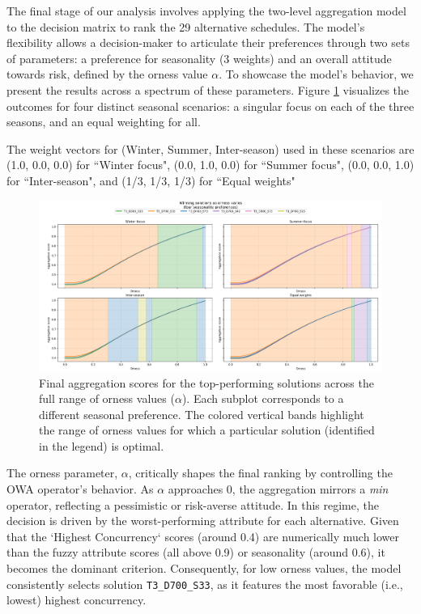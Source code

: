 \label{sec:results}

The final stage of our analysis involves applying the two-level aggregation model to the decision matrix to rank the 29 alternative schedules. The model's flexibility allows a decision-maker to articulate their preferences through two sets of parameters: a preference for seasonality (3 weights) and an overall attitude towards risk, defined by the orness value $\alpha$. To showcase the model's behavior, we present the results across a spectrum of these parameters. Figure \ref{fig:results_plot} visualizes the outcomes for four distinct seasonal scenarios: a singular focus on each of the three seasons, and an equal weighting for all. 

The weight vectors for (Winter, Summer, Inter-season) used in these scenarios are (1.0, 0.0, 0.0) for ``Winter focus", (0.0, 1.0, 0.0) for ``Summer focus", (0.0, 0.0, 1.0) for ``Inter-season", and (1/3, 1/3, 1/3) for ``Equal weights"

\begin{figure}[h!]
    \centering
    \begin{adjustwidth}{-1.2cm}{-1.8cm}
    \includegraphics[width=1.08\textwidth]{ch3/figures/ResultsOrness.png}
    \end{adjustwidth}
    \caption{Final aggregation scores for the top-performing solutions across the full range of orness values ($\alpha$). Each subplot corresponds to a different seasonal preference. The colored vertical bands highlight the range of orness values for which a particular solution (identified in the legend) is optimal.}
    \label{fig:results_plot}
\end{figure}

The orness parameter, $\alpha$, critically shapes the final ranking by controlling the OWA operator's behavior. As $\alpha$ approaches 0, the aggregation mirrors a \textit{min} operator, reflecting a pessimistic or risk-averse attitude. In this regime, the decision is driven by the worst-performing attribute for each alternative. Given that the `Highest Concurrency` scores (around 0.4) are numerically much lower than the fuzzy attribute scores (all above 0.9) or seasonality (around 0.6), it becomes the dominant criterion. Consequently, for low orness values, the model consistently selects solution \texttt{T3\_D700\_S33}, as it features the most favorable (i.e., lowest) highest concurrency.\\

